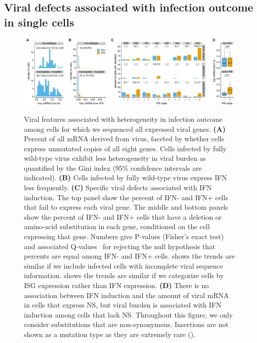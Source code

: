 \documentclass[9pt,lineno]{elife}
\begin{document}
\subsection{Viral defects associated with infection outcome in single cells}

\begin{figure}
\begin{fullwidth}
{\centering
\includegraphics[width=\linewidth]{figures/single_cell_figures/p_mutations.pdf}
}
\caption{
Viral features associated with heterogeneity in infection outcome among cells for which we sequenced all expressed viral genes.
{\bf (A)} 
Percent of all mRNA derived from virus, faceted by whether cells express unmutated copies of all eight genes.
Cells infected by fully wild-type virus exhibit less heterogeneity in viral burden as quantified by the Gini index (95\% confidence intervals are indicated).
{\bf (B)}
Cells infected by fully wild-type virus express IFN less frequently.
{\bf (C)}
Specific viral defects associated with IFN induction.
The top panel show the percent of IFN- and IFN+ cells that fail to express each viral gene.
The middle and bottom panels show the percent of IFN- and IFN+ cells that have a deletion or amino-acid substitution in each gene, conditioned on the cell expressing that gene.
Numbers give P-values (Fisher's exact test) and associated Q-values~\citep{storey2003statistical} for rejecting the null hypothesis that percents are equal among IFN- and IFN+ cells. 
 shows the trends are similar if we include infected cells with incomplete viral sequence information. 
 shows the trends are similar if we categorize cells by ISG expression rather than IFN expression.
{\bf (D)}
There is no association between IFN induction and the amount of viral mRNA in cells that express NS, but viral burden is associated with IFN induction among cells that lack NS.
Throughout this figure, we only consider substitutions that are non-synonymous.
Insertions are not shown as a mutation type as they are extremely rare ().
}
\label{fig:mutations}


\end{fullwidth}
\end{figure}
\end{document}
